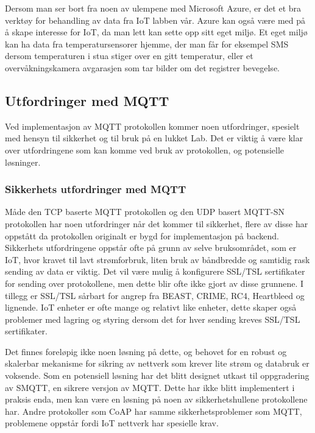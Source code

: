 \documentclass{article}
\begin{document}
Dersom man ser bort fra noen av ulempene med Microsoft Azure, er det et bra verktøy for behandling av data fra IoT labben vår. Azure kan også være med på å skape interesse for IoT, da man lett kan sette opp sitt eget miljø. Et eget miljø kan ha data fra temperatursensorer hjemme, der man får for eksempel SMS dersom temperaturen i stua stiger over en gitt temperatur, eller et overvåkningskamera avgarasjen som tar bilder om det registrer bevegelse. 

\subsection{Utfordringer med MQTT}
Ved implementasjon av MQTT protokollen kommer noen utfordringer, spesielt med hensyn til sikkerhet og til bruk på en lukket Lab. Det er viktig å være klar over utfordringene som kan komme ved bruk av protokollen, og potensielle løsninger. 

\subsubsection{Sikkerhets utfordringer med MQTT}
Måde den TCP baserte MQTT protokollen og den UDP basert MQTT-SN protokollen har noen utfordringer når det kommer til sikkerhet, flere av disse har oppstått da protokollen originalt er bygd for implementasjon på backend. Sikkerhets utfordringene oppstår ofte på grunn av selve bruksområdet, som er IoT, hvor kravet til lavt strømforbruk, liten bruk av båndbredde og samtidig rask sending av data er viktig. Det vil være mulig å konfigurere SSL/TSL sertifikater for sending over protokollene, men dette blir ofte ikke gjort av disse grunnene. I tillegg er SSL/TSL sårbart for angrep fra BEAST, CRIME, RC4, Heartbleed og lignende. IoT enheter er ofte mange og relativt like enheter, dette skaper også problemer med lagring og styring dersom det for hver sending kreves SSL/TSL sertifikater.

Det finnes foreløpig ikke noen løsning på dette, og behovet for en robust og skalerbar mekanisme for sikring av nettverk som krever lite strøm og databruk er voksende. Som en potensiell løsning har det blitt designet utkast til oppgradering av SMQTT, en sikrere versjon av MQTT. Dette har ikke blitt implementert i praksis enda, men kan være en løsning på noen av sikkerhetshullene protokollene har. Andre protokoller som CoAP har samme sikkerhetsproblemer som MQTT, problemene oppstår fordi IoT nettverk har spesielle krav.
\end{document}

